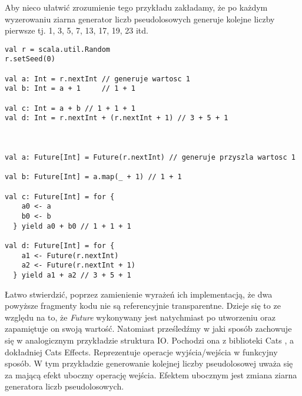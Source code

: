 \documentclass[../main.tex]{subfiles}
\begin{document}
Aby nieco ułatwić zrozumienie tego przykładu zakładamy, że po każdym wyzerowaniu ziarna generator liczb pseudolosowych generuje kolejne liczby pierwsze tj. 1, 3, 5, 7, 13, 17, 19, 23 itd.

\begin{lstlisting}
val r = scala.util.Random
r.setSeed(0)

val a: Int = r.nextInt // generuje wartosc 1
val b: Int = a + 1     // 1 + 1

val c: Int = a + b // 1 + 1 + 1
val d: Int = r.nextInt + (r.nextInt + 1) // 3 + 5 + 1



val a: Future[Int] = Future(r.nextInt) // generuje przyszla wartosc 1

val b: Future[Int] = a.map(_ + 1) // 1 + 1

val c: Future[Int] = for { 
    a0 <- a
    b0 <- b 
  } yield a0 + b0 // 1 + 1 + 1

val d: Future[Int] = for {  
    a1 <- Future(r.nextInt)
    a2 <- Future(r.nextInt + 1) 
  } yield a1 + a2 // 3 + 5 + 1

\end{lstlisting}

Łatwo stwierdzić, poprzez zamienienie wyrażeń ich implementacją, że dwa powyższe fragmenty kodu nie są referencyjnie transparentne. Dzieje się to ze względu na to, że \textit{Future} wykonywany jest natychmiast po utworzeniu oraz zapamiętuje on swoją wartość.\newline
Natomiast prześledźmy w jaki sposób zachowuje się w analogicznym przykładzie struktura IO. Pochodzi ona z biblioteki Cats \cite{WEBSITE:CatsDataTypes}, a dokładniej Cats Effects. Reprezentuje operacje wyjścia/wejścia w funkcyjny sposób. W tym przykładzie generowanie kolejnej liczby pseudolosowej uważa się za mającą efekt uboczny operację wejścia. Efektem ubocznym jest zmiana ziarna generatora liczb pseudolosowych.
\end{document}
